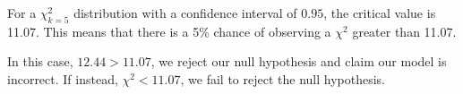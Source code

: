 \documentclass[12pt]{article}
\numberwithin{equation}{section}
\theoremstyle{definition}
\begin{document}
For a $\chi^2_{k=5}$ distribution with a confidence interval of $ 0.95 $, the critical value is 11.07. This means that there is a 5\% chance of observing a $\chi^2$ greater than 11.07. 

In this case, $ 12.44>11.07 $, we reject our null hypothesis and claim our model is incorrect. If instead, $ \chi^2 < 11.07 $, we fail to reject the null hypothesis.
	
\end{document}
